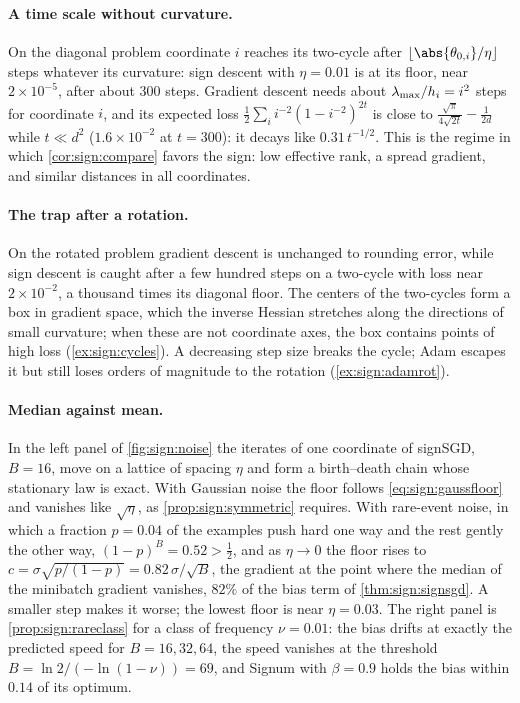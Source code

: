 \begin{refsection}
\paragraph{A time scale without curvature.} On the diagonal problem coordinate $i$ reaches its two-cycle after $\lfloor\abs{\theta_{0,i}}/\eta\rfloor$ steps whatever its curvature: sign descent with $\eta=0.01$ is at its floor, near $2\times10^{-5}$, after about $300$ steps. Gradient descent needs about $\lambda_{\max}/h_i=i^2$ steps for coordinate $i$, and its expected loss $\frac12\sum_ii^{-2}(1-i^{-2})^{2t}$ is close to $\frac{\sqrt\pi}{4\sqrt{2t}}-\frac1{2d}$ while $t\ll d^2$ ($1.6\times10^{-2}$ at $t=300$): it decays like $0.31\,t^{-1/2}$. This is the regime in which \cref{cor:sign:compare} favors the sign: low effective rank, a spread gradient, and similar distances in all coordinates.

\paragraph{The trap after a rotation.} On the rotated problem gradient descent is unchanged to rounding error, while sign descent is caught after a few hundred steps on a two-cycle with loss near $2\times10^{-2}$, a thousand times its diagonal floor. The centers of the two-cycles form a box in gradient space, which the inverse Hessian stretches along the directions of small curvature; when these are not coordinate axes, the box contains points of high loss (\cref{ex:sign:cycles}). A decreasing step size breaks the cycle; Adam escapes it but still loses orders of magnitude to the rotation (\cref{ex:sign:adamrot}).

\paragraph{Median against mean.} In the left panel of \cref{fig:sign:noise} the iterates of one coordinate of signSGD, $B=16$, move on a lattice of spacing $\eta$ and form a birth--death chain whose stationary law is exact. With Gaussian noise the floor follows \eqref{eq:sign:gaussfloor} and vanishes like $\sqrt\eta$, as \cref{prop:sign:symmetric} requires. With rare-event noise, in which a fraction $p=0.04$ of the examples push hard one way and the rest gently the other way, $(1-p)^B=0.52>\frac12$, and as $\eta\to0$ the floor rises to $c=\sigma\sqrt{p/(1-p)}=0.82\,\sigma/\sqrt B$, the gradient at the point where the median of the minibatch gradient vanishes, $82\%$ of the bias term of \cref{thm:sign:signsgd}. A smaller step makes it worse; the lowest floor is near $\eta=0.03$. The right panel is \cref{prop:sign:rareclass} for a class of frequency $\nu=0.01$: the bias drifts at exactly the predicted speed for $B=16,32,64$, the speed vanishes at the threshold $B=\ln2/(-\ln(1-\nu))=69$, and Signum with $\beta=0.9$ holds the bias within $0.14$ of its optimum.


\end{refsection}
